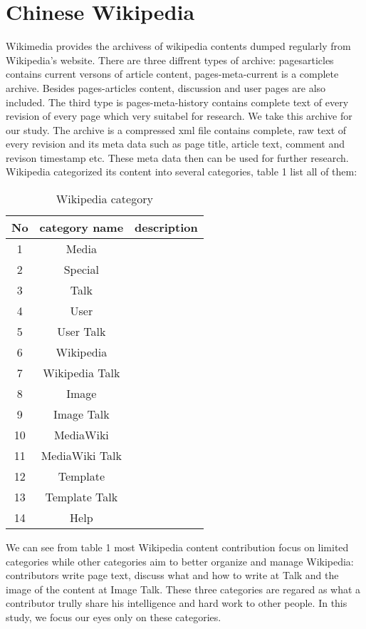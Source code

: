 \documentclass{elsarticle}
\begin{document}
\section{Chinese Wikipedia}
\label{sec:introduction-1}
Wikimedia provides the archivess of  wikipedia contents dumped
regularly from
Wikipedia's website.  There are three diffrent types of archive: 
pages\nobreakdash{-}articles contains current versons of article content,
pages-meta-current is  a   complete archive. Besides pages-articles
content, discussion and user pages are also included.  The third type
is pages-meta-history contains complete text of every revision of
every page which very suitabel  for research. We take this archive for
our study. The archive is a
compressed xml file  contains complete, raw text of every revision and
its meta data such as page title, article text, comment and revison
timestamp etc. These meta data then can be used for further research.
Wikipedia categorized its content into several categories, table 1
list all of them:
\begin{table}
 \centering
 \caption{Wikipedia category}
  \begin{tabular}[center]{|c|c|c|}
  \hline
  No  & category name  & description \\
  \hline
   1 & Media & \\\hline 
  2 &Special & \\\hline
  3 & Talk & \\\hline
  4 &  User  & \\\hline
  5 & User Talk & \\\hline
  6 & Wikipedia  & \\\hline
  7 & Wikipedia Talk & \\\hline
  8 &  Image & \\\hline
  9 & Image Talk & \\\hline
  10 &  MediaWiki& \\\hline
  11 & MediaWiki Talk& \\\hline
12 & Template& \\\hline
13 & Template Talk& \\\hline
14 & Help& \\\hline
  \end{tabular}
\end{table}
We can see from table 1 most Wikipedia content contribution focus on
limited categories while other categories aim to better organize and
manage Wikipedia: contributors write page text, discuss what and how
to write at Talk and  the image of the content at Image Talk. These
three categories are regared as what a contributor trully share his
intelligence and hard work to other people. In this study, we focus
our eyes only on these categories. 
\end{document}
